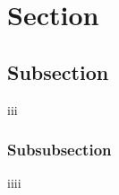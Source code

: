\documentclass[11pt]{article}
\begin{document}
\tableofcontents

\section{Section}

\subsection{Subsection}
iii
\subsubsection{Subsubsection}
iiii
\lipsum[1]\\

\cite{jenkins2003}

\printbibliography
\end{document}
